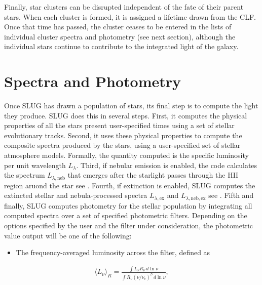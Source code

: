 \documentclass[letterpaper,10pt,english]{sphinxmanual}
\begin{document}
Finally, star clusters can be disrupted independent of the fate of their parent stars. When each cluster is formed, it is assigned a lifetime drawn from the CLF. Once that time has passed, the cluster ceases to be entered in the lists of individual cluster spectra and photometry (see next section), although the individual stars continue to contribute to the integrated light of the galaxy.


\section{Spectra and Photometry}
\label{\detokenize{intro:ssec-spec-phot}}\label{\detokenize{intro:spectra-and-photometry}}
Once SLUG has drawn a population of stars, its final step is to compute the light they produce. SLUG does this in several steps. First, it computes the physical properties of all the stars present user-specified times using a set of stellar evolutionary tracks. Second, it uses these physical properties to compute the composite spectra produced by the stars, using a user-specified set of stellar atmosphere models. Formally, the quantity computed is the specific luminosity per unit wavelength \(L_\lambda\). Third, if nebular emission is enabled, the code calculates the spectrum \(L_{\lambda,\mathrm{neb}}\) that emerges after the starlight passes through the HII region aruond the star \textendash{} see {\hyperref[\detokenize{intro:ssec-nebula}]{}}. Fourth, if extinction is enabled, SLUG computes the extincted stellar and nebula-processed spectra \(L_{\lambda,\mathrm{ex}}\) and \(L_{\lambda,\mathrm{neb,ex}}\) \textendash{} see {\hyperref[\detokenize{intro:ssec-extinction}]{}}. Fifth and finally, SLUG computes photometry for the stellar population by integrating all computed spectra over a set of specified photometric filters. Depending on the options specified by the user and the filter under consideration, the photometric value output will be one of the following:
\begin{itemize}
\item {} 
The frequency-averaged luminosity across the filter, defined as

\end{itemize}
\begin{equation*}
\begin{split}\langle L_\nu\rangle_R = \frac{\int L_\nu R_\nu \, d\ln\nu}{\int R_\nu (\nu/\nu_c)^\beta \, d\ln\nu},\end{split}
\end{equation*}
\end{document}
